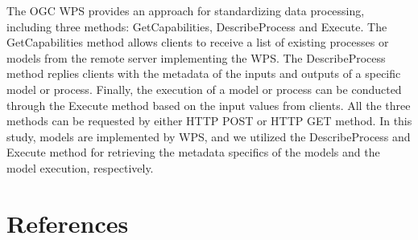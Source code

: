 \documentclass[review]{elsarticle}
\begin{document}
The OGC WPS provides an approach for standardizing data processing, including three methods: GetCapabilities, DescribeProcess and Execute. The GetCapabilities method allows clients to receive a list of existing processes or models from the remote server implementing the WPS. The DescribeProcess method replies clients with the metadata of the inputs and outputs of a specific model or process. Finally, the execution of a model or process can be conducted through the Execute method based on the input values from clients. All the three methods can be requested by either HTTP POST or HTTP GET method. In this study, models are implemented by WPS, and we utilized the DescribeProcess and Execute method for retrieving the metadata specifics of the models and the model execution, respectively.



\section*{References}


\end{document}

